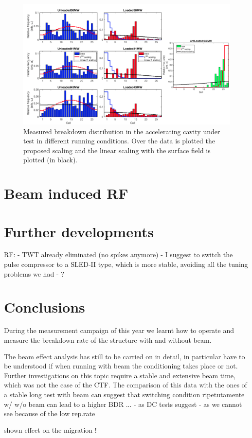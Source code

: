 \begin{landscape}


\begin{figure}[h]
\centering 
\includegraphics[scale=0.53]{pictures/distro_all.png}
\caption{Measured breakdown distribution in the accelerating cavity under test in different running conditions. Over the data is plotted the proposed scaling and the linear scaling with the surface field is plotted (in black).}
\label{BD_distro}
\end{figure}

 
\end{landscape}







\section[Beam induced RF]{Beam induced RF}






\section[Further developments]{Further developments}


RF:
- TWT already eliminated (no spikes anymore)
- I suggest to switch the pulse compressor to a SLED-II type, which is more stable, avoiding all the tuning problems we had
- ?


\section{Conclusions}

During the measurement campaign of this year we learnt how to operate and measure the breakdown rate of the structure with and without beam.

The beam effect analysis has still to be carried on in detail, in particular have to be understood if when running with beam the conditioning takes place or not. Further investigations on this topic require a stable and extensive beam time, which was not the case of the CTF. The comparison of this data with the ones of a stable long test with beam can suggest that switching condition ripetutamente w/ w/o beam can lead to a higher BDR ...
- as DC tests suggest
- as we cannot see because of the low rep.rate



shown effect on the migration !